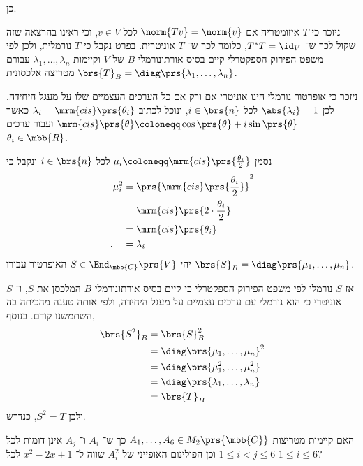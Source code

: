 \documentclass[a4paper,10pt,twoside,openany]{article}
\begin{document}
\begin{solution}
כן.

ניזכר כי
$T$
איזומטריה אם
$\norm{Tv} = \norm{v}$
לכל
$v \in V$,
וכי ראינו בהרצאה שזה שקול לכך ש־%
$T^* T = \id_V$,
כלומר לכך ש־%
$T$
אוניטרית.
בפרט נקבל כי
$T$
נורמלית, ולכן לפי משפט הפירוק הספקטרלי קיים בסיס אורתונורמלי
$B$
של
$V$
וקיימות
$\lambda_1, \ldots, \lambda_n$
עבורם
$\brs{T}_B = \diag\prs{\lambda_1, \ldots, \lambda_n}$
מטריצה אלכסונית.

ניזכר כי אופרטור נורמלי הינו אוניטרי אם ורק אם כל הערכים העצמיים שלו על מעגל היחידה. לכן
$\abs{\lambda_i} = 1$
לכל
$i \in \brs{n}$,
ונוכל לכתוב
$\lambda_i = \mrm{cis}\prs{\theta_i}$
כאשר
$\mrm{cis}\prs{\theta} \coloneqq \cos\prs{\theta} + i \sin\prs{\theta}$
ועבור ערכים
$\theta_i \in \mbb{R}$.

נסמן
$\mu_i \coloneqq \mrm{cis}\prs{\frac{\theta_i}{2}}$
לכל
$i \in \brs{n}$
ונקבל כי
\begin{align*}
\mu_i^2 &=
\prs{\mrm{cis}\prs{\frac{\theta_i}{2}}}^2
\\&= \mrm{cis}\prs{2 \cdot \frac{\theta_i}{2}}
\\&= \mrm{cis}\prs{\theta_i}
\\ \text{.} \hphantom{\mu_i^2} &= \lambda_i
\end{align*}
יהי
$S \in \End_{\mbb{C}}\prs{V}$
האופרטור עבורו
$\brs{S}_B = \diag\prs{\mu_1, \ldots, \mu_n}$.

אז
$S$
נורמלי לפי משפט הפירוק הספקטרלי כי קיים בסיס אורתונורמלי
$B$
המלכסן את
$S$,
ו־%
$S$
אוניטרי כי הוא נורמלי עם ערכים עצמיים על מעגל היחידה, ולפי אותה טענה מהכיתה בה השתמשנו קודם.
בנוסף,
\begin{align*}
\brs{S^2}_B &= \brs{S}_B^2
\\&= \diag\prs{\mu_1, \ldots, \mu_n}^2
\\&= \diag\prs{\mu_1^2, \ldots, \mu_n^2}
\\&= \diag\prs{\lambda_1, \ldots, \lambda_n}
\\&= \brs{T}_B
\end{align*}
ולכן
$S^2 = T$,
כנדרש.
\end{solution}

\newpage

\begin{exercise}
האם קיימות מטריצות
$A_1, \ldots, A_6 \in M_2\prs{\mbb{C}}$
כך ש־%
$A_i$
ו־%
$A_j$
אינן דומות לכל
$1 \leq i < j \leq 6$
וכן הפולינום האופייני של
$A_i^2$
שווה ל־%
$x^2 - 2x + 1$
לכל
$1 \leq i \leq 6$?
\end{exercise}
\end{document}
